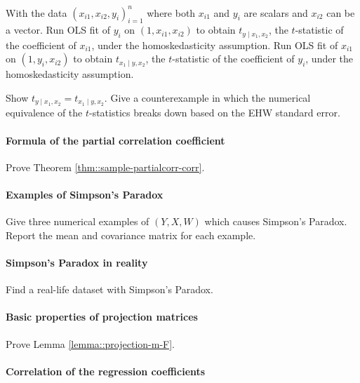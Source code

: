 With the data $(x_{i1}, x_{i2}, y_i)_{i=1}^n$ where both $x_{i1}$ and $y_i$ are scalars and $x_{i2}$ can be a vector. Run OLS fit of $y_i$ on $(1,x_{i1}, x_{i2})$ to obtain $t_{y\mid x_1, x_2}$, the $t$-statistic of the coefficient of $x_{i1}$, under the homoskedasticity assumption. Run OLS fit of $x_{i1}$ on $(1, y_i, x_{i2})$ to obtain $t_{x_1\mid y, x_2}$, the $t$-statistic of the coefficient of $y_i$, under the homoskedasticity assumption. 

Show $t_{y\mid x_1, x_2} = t_{x_1\mid y, x_2} $. Give a counterexample in which the numerical equivalence of the $t$-statistics breaks down based on the EHW standard error. 

 








\paragraph{Formula of the partial correlation coefficient}\label{hw7::sample-partial-correlation}

Prove Theorem \ref{thm::sample-partialcorr-corr}. 

\paragraph{Examples of Simpson's Paradox}

Give three numerical examples of $(Y,X,W)$ which causes Simpson's Paradox. Report the mean and covariance matrix for each example. 


\paragraph{Simpson's Paradox in reality}

Find a real-life dataset with Simpson's Paradox. 


\paragraph{Basic properties of projection matrices}\label{problem07::projection-matrices}
 
Prove Lemma \ref{lemma::projection-m-F}. 





\paragraph{Correlation of the regression coefficients}\label{hw::7:corr-reg-coef}


